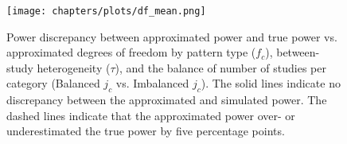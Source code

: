 


\begin{figure}
    \centering
    \vspace{-5pt}\texttt{[image: chapters/plots/df\_mean.png]}\caption{Power discrepancy between approximated power and true power vs. approximated degrees of freedom by pattern type ($f_c$), between-study heterogeneity ($\tau$), and the balance of number of studies per category (Balanced $j_c$ vs. Imbalanced $j_c$). The solid lines indicate no discrepancy between the approximated and simulated power. The dashed lines indicate that the approximated power over- or underestimated the true power by five percentage points. \label{fig: df_mean}}
    \vspace{-5pt}
\end{figure}  


